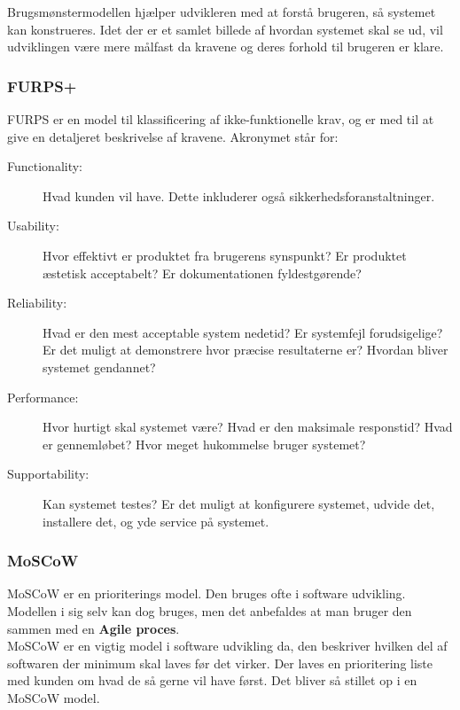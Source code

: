 \noindent
Brugsmønstermodellen hjælper udvikleren med at forstå brugeren, så systemet kan konstrueres. Idet der er et samlet billede af hvordan systemet skal se ud, vil udviklingen være mere målfast da kravene og deres forhold til brugeren er klare.


\subsubsection{FURPS+}
FURPS er en model til klassificering af ikke-funktionelle krav, og er med til at give en detaljeret beskrivelse af kravene. Akronymet står for:

\noindent
\begin{description}
    \item [Functionality:] Hvad kunden vil have. Dette inkluderer også sikkerhedsforanstaltninger.
    \item [Usability:] Hvor effektivt er produktet fra brugerens synspunkt? Er produktet æstetisk acceptabelt? Er dokumentationen fyldestgørende? 
    \item [Reliability:] Hvad er den mest acceptable system nedetid? Er systemfejl forudsigelige? Er det muligt at demonstrere hvor præcise resultaterne er? Hvordan bliver systemet gendannet?
    \item [Performance:] Hvor hurtigt skal systemet være? Hvad er den maksimale responstid? Hvad er gennemløbet? Hvor meget hukommelse bruger systemet?
    \item [Supportability:] Kan systemet testes? Er det muligt at konfigurere systemet, udvide det, installere det, og yde service på systemet.
\end{description}


\subsubsection{MoSCoW}
MoSCoW er en prioriterings model. Den bruges ofte i software udvikling.\\
Modellen i sig selv kan dog bruges, men det anbefaldes at man bruger den sammen med en \textbf{Agile proces}. \\

\noindent
MoSCoW er en vigtig model i software udvikling da, den beskriver hvilken del af softwaren der minimum skal laves før det virker. Der laves en prioritering liste med kunden om hvad de så gerne vil have først. Det bliver så stillet op i en MoSCoW model.

